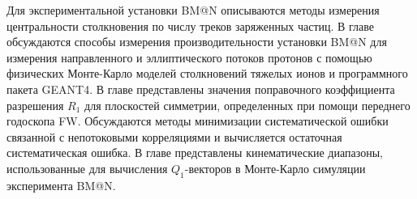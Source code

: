 Для экспериментальной установки BM@N описываются методы измерения центральности столкновения по числу треков заряженных частиц. 
В главе обсуждаются способы измерения производительности установки BM@N для измерения направленного и эллиптического потоков протонов с помощью физических Монте-Карло моделей столкновений тяжелых ионов и программного пакета GEANT4.
В главе представлены значения поправочного коэффициента разрешения $R_1$ для плоскостей симметрии, определенных при помощи переднего годоскопа FW.
Обсуждаются методы минимизации систематической ошибки связанной с непотоковыми корреляциями и вычисляется остаточная систематическая ошибка.
В главе представлены кинематические диапазоны, использованные для вычисления $Q_1$-векторов в Монте-Карло симуляции эксперимента BM@N.